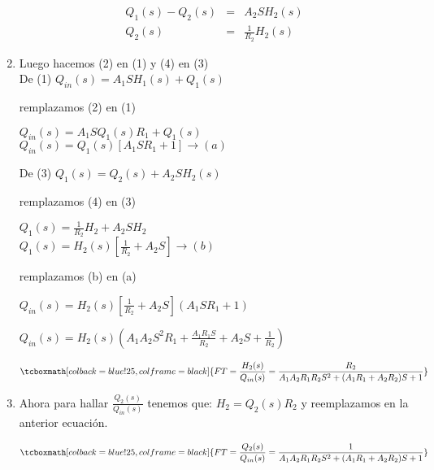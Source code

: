 \documentclass[12pt]{article}
\begin{document}
\begin{enumerate}
    \begin{eqnarray}
      Q_{1}(s) - Q_{2}(s) &=& A_{2}SH_{2}(s) \\[2mm]
      Q_{2}(s) &=& \frac{1}{R_{2}}H_{2}(s)
    \end{eqnarray}

  \item Luego hacemos (2) en (1) y (4) en (3) \\

    De (1) \hspace{5mm} \(\displaystyle Q_{in}(s)=A_{1}SH_{1}(s)+Q_{1}(s)\)

    remplazamos (2) en (1)

   \(\displaystyle Q_{in}(s)=A_{1}SQ_{1}(s)R_{1}+Q_{1}(s)\)\\

   \(\displaystyle Q_{in}(s)=Q_{1}(s)[A_{1}SR_{1}+1] \rightarrow (a)\)

   \vspace{1cm}

   De (3) \hspace{5mm} \(\displaystyle Q_{1}(s)=Q_{2}(s)+A_{2}SH_{2}(s)\)

   remplazamos (4) en (3)

    \(\displaystyle Q_{1}(s)=\frac{1}{R_{2}}H_{2}+A_{2}SH_{2} \)\\

    \(\displaystyle Q_{1}(s)=H_{2}(s) \left[\frac{1}{R_{2}}+A_{2}S \right] \rightarrow (b)\)

    remplazamos (b) en (a)

    \(\displaystyle Q_{in}(s)=H_{2}(s)\left[\frac{1}{R_{2}}+A_{2}S \right](A_{1}SR_{1}+1)\)

    \( \displaystyle Q_{in}(s)=H_{2}(s) \left( A_{1}A_{2}S^{2}R_{1}+\frac{A_{1}R_{1}S}{R_{2}}+A_{2}S+\frac{1}{R_{2}} \right) \)
    
    \begin{eqnarray*}
      \tcboxmath[colback=blue!25,colframe=black]
      {FT=\frac{H_{2}(s)}{Q_{in}(s)}=\frac{R_{2}}{A_{1}A_{2}R_{1}R_{2}S^{2}+(A_{1}R_{1}+A_{2}R_{2})S+1}}
    \end{eqnarray*}

  \item Ahora para hallar \(\frac{Q_{2}(s)}{Q_{in}(s)}\) tenemos que: \(\displaystyle H_{2}=Q_{2}(s)R_{2}\) y reemplazamos en la anterior ecuaci\'on.

    \begin{eqnarray*}
      \tcboxmath[colback=blue!25,colframe=black]
      {FT=\frac{Q_{2}(s)}{Q_{in}(s)}=\frac{1}{A_{1}A_{2}R_{1}R_{2}S^{2}+(A_{1}R_{1}+A_{2}R_{2})S+1}}
    \end{eqnarray*}


\end{enumerate}
\end{document}
